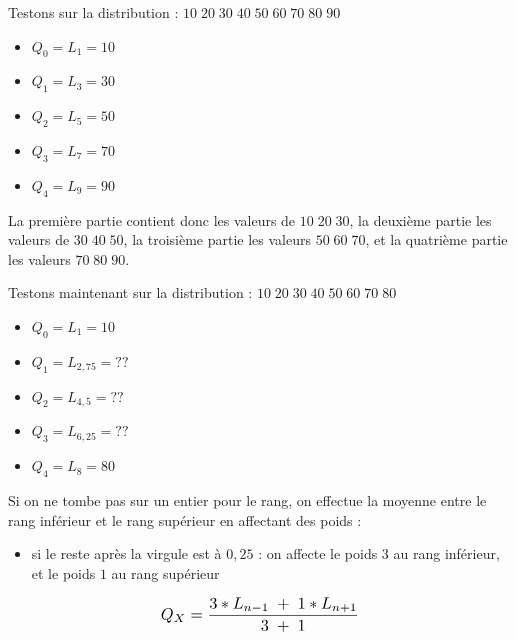 \bigskip

\noindent Testons sur la distribution : $ 10 \; 20 \; 30 \; 40 \; 50 \; 60 \; 70 \; 80 \; 90 $

\begin{itemize}
\item $ Q_{0} = L_{1} = 10 $
\item $ Q_{1} = L_{3} = 30 $
\item $ Q_{2} = L_{5} = 50 $
\item $ Q_{3} = L_{7} = 70 $
\item $ Q_{4} = L_{9} = 90 $
\end{itemize}

\bigskip

\noindent La première partie contient donc les valeurs de $ 10 \; 20 \; 30 $, la deuxième partie les valeurs de $ 30 \; 40 \; 50 $, la troisième partie les valeurs $ 50 \; 60 \; 70 $, et la quatrième partie les valeurs $ 70 \; 80 \; 90 $.

\bigskip

\noindent Testons maintenant sur la distribution : $ 10 \; 20 \; 30 \; 40 \; 50 \; 60 \; 70 \; 80 $

\begin{itemize}
\item $ Q_{0} = L_{1} = 10 $
\item $ Q_{1} = L_{2,75} = ?? $
\item $ Q_{2} = L_{4,5}  = ?? $
\item $ Q_{3} = L_{6,25} = ?? $
\item $ Q_{4} = L_{8} = 80 $
\end{itemize}

\bigskip

\noindent Si on ne tombe pas sur un entier pour le rang, on effectue la moyenne entre le rang inférieur et le rang supérieur en affectant des poids :

\bigskip

\begin{itemize}
\item si le reste après la virgule est à $ 0,25 $ : on affecte le poids $ 3 $ au rang inférieur, et le poids $ 1 $ au rang supérieur
\end{itemize}
\vspace*{-1cm}
\begin{center}
\[ \scalebox{1.15}{$\displaystyle Q_{X} = \frac{3 * L_{n - 1} \; + \; 1 * L_{n + 1}}{3 \; + \; 1} $} \]
\end{center}


